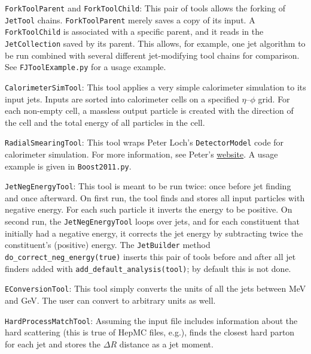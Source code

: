 \documentclass{article}
\newcommand{\code}[1]{{\tt #1}\xspace}
\begin{document}
\begin{description}
\item{\code{ForkToolParent} and \code{ForkToolChild}}:
This pair of tools allows the forking of \code{JetTool} chains.  \code{ForkToolParent} merely saves a copy of its input.  A \code{ForkToolChild} is associated with a specific parent, and it reads in the \code{JetCollection} saved by its parent.  This allows, for example, one jet algorithm to be run combined with several different jet-modifying tool chains for comparison.  See \verb+FJToolExample.py+ for a usage example.

\item{\code{CalorimeterSimTool}}:
This tool applies a very simple calorimeter simulation to its input jets.  Inputs are sorted into calorimeter cells on a specified $\eta$--$\phi$ grid.  For each non-empty cell, a massless output particle is created with the direction of the cell and the total energy of all particles in the cell.

\item{\code{RadialSmearingTool}}:
This tool wraps Peter Loch's \code{DetectorModel} code for calorimeter simulation.  For more information, see Peter's \href{http://atlas.physics.arizona.edu/~loch/index.html}{website}.  A usage example is given in \verb+Boost2011.py+.

\item{\code{JetNegEnergyTool}}:
This tool is meant to be run twice: once before jet finding and once afterward.  On first run, the tool finds and stores all input particles with negative energy.  For each such particle it inverts the energy to be positive.  On second run, the \code{JetNegEnergyTool} loops over jets, and for each constituent that initially had a negative energy, it corrects the jet energy by subtracting twice the constituent's (positive) energy.  The \code{JetBuilder} method \code{do\_correct\_neg\_energy(true)} inserts this pair of tools before and after all jet finders added with \code{add\_default\_analysis(tool)}; by default this is not done.

\item{\code{EConversionTool}}:
This tool simply converts the units of all the jets between MeV and GeV.  The user can convert to arbitrary units as well.

\item \code{HardProcessMatchTool}:
Assuming the input file includes information about the hard scattering (this is true of HepMC files, e.g.), finds the closest hard parton for each jet and stores the $\Delta R$ distance as a jet moment.


\end{description}
\end{document}
